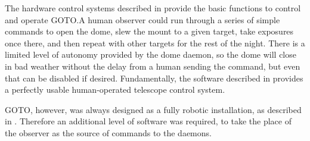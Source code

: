 
\begin{colsection}

The hardware control systems described in  provide the basic functions to control and operate GOTO.\@ A human observer could run through a series of simple commands to open the dome, slew the mount to a given target, take exposures once there, and then repeat with other targets for the rest of the night. There is a limited level of autonomy provided by the dome daemon, so the dome will close in bad weather without the delay from a human sending the command, but even that can be disabled if desired. Fundamentally, the software described in  provides a perfectly usable human-operated telescope control system.

GOTO, however, was always designed as a fully robotic installation, as described in . Therefore an additional level of software was required, to take the place of the observer as the source of commands to the daemons.

\end{colsection}


